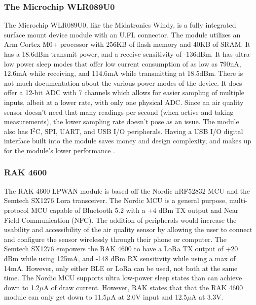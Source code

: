 \subsubsection{The Microchip WLR089U0}
The Microchip WLR089U0, like the Midatronics Windy, is a fully integrated
surface mount device module with an U.FL connector. The module utilizes an Arm
Cortex M0+ processor with 256KB of flash memory and 40KB of SRAM. It has a
18.6dBm transmit power, and a receive sensitivity of -136dBm. It has ultra-low
power sleep modes that offer low current consumption of as low as 790nA, 12.6mA
while receiving, and 114.6mA while transmitting at 18.5dBm. There is not much
documentation about the various power modes of the device. It does offer a
12-bit ADC with 7 channels which allows for easier sampling of multiple inputs,
albeit at a lower rate, with only one physical ADC. Since an air quality sensor
doesn't need that many readings per second (when active and taking
measurements), the lower sampling rate doesn't pose as an issue. The module also
has I$^2$C, SPI, UART, and USB I/O peripherals. Having a USB I/O digital
interface built into the module saves money and design complexity, and makes up
for the module's lower performance \cite{ds-wlr089u0}\cite{ds-atsamr34j18}.

\subsubsection{RAK 4600}
The RAK 4600 LPWAN module is based off the Nordic nRF52832 MCU and the
Semtech SX1276 Lora transceiver. The Nordic MCU is a general purpose,
multi-protocol MCU capable of Bluetooth 5.2 with a +4 dBm TX output and Near
Field Communication (NFC). The addition of peripherals would increase the
usability and accessibility of the air quality sensor by allowing the user to
connect and configure the sensor wirelessly through their phone or computer. The
Semtech SX1276 empowers the RAK 4600 to have a LoRa TX output of +20 dBm while
using 125mA, and -148 dBm RX sensitivity while using a max of 14mA. However,
only either BLE or LoRa can be used, not both at the same time. The Nordic MCU
supports ultra low-power sleep states than can achieve down to 1.2$\mu$A of draw
current. However, RAK states that that the RAK 4600 module can only get down to
11.5$\mu$A at 2.0V input and 12.5$\mu$A at 3.3V.

